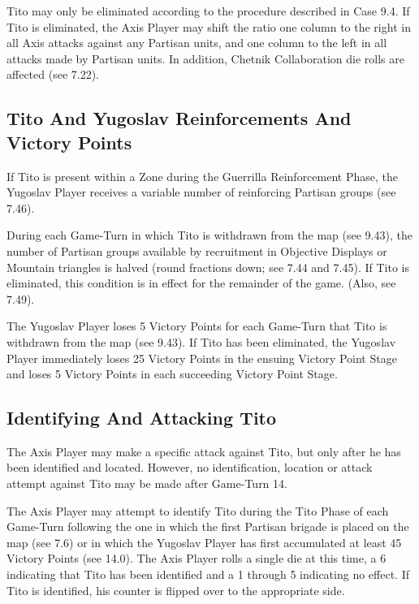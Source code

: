  Tito may only be eliminated according to the procedure described in Case 9.4. If Tito is eliminated, the Axis Player may shift the ratio one column to the right in all Axis attacks against any Partisan units, and one column to the left in all attacks made by Partisan units. In addition, Chetnik Collaboration die rolls are affected (see 7.22).

\subsection{Tito And Yugoslav Reinforcements And Victory Points}\label{sec:9.3}

 If Tito is present within a Zone during the Guerrilla Reinforcement Phase, the Yugoslav Player receives a variable number of reinforcing Partisan groups (see 7.46).

 During each Game-Turn in which Tito is withdrawn from the map (see 9.43), the number of Partisan groups available by recruitment in Objective Displays or Mountain triangles is halved (round fractions down; see 7.44 and 7.45). If Tito is eliminated, this condition is in effect for the remainder of the game. (Also, see 7.49).

 The Yugoslav Player loses 5 Victory Points for each Game-Turn that Tito is withdrawn from the map (see 9.43). If Tito has been eliminated, the Yugoslav Player immediately loses 25 Victory Points in the ensuing Victory Point Stage and loses 5 Victory Points in each succeeding Victory Point Stage.

\subsection{Identifying And Attacking Tito}\label{sec:9.4}

The Axis Player may make a specific attack against Tito, but only after he has been identified and located. However, no identification, location or attack attempt against Tito may be made after Game-Turn 14.

 The Axis Player may attempt to identify Tito during the Tito Phase of each Game-Turn following the one in which the first Partisan brigade is placed on the map (see 7.6) or in which the Yugoslav Player has first accumulated at least 45 Victory Points (see 14.0). The Axis Player rolls a single die at this time, a 6 indicating that Tito has been identified and a 1 through 5 indicating no effect. If Tito is identified, his counter is flipped over to the appropriate side.

